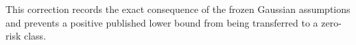This correction records the exact consequence of the frozen Gaussian assumptions and prevents a positive published lower bound from being transferred to a zero-risk class.